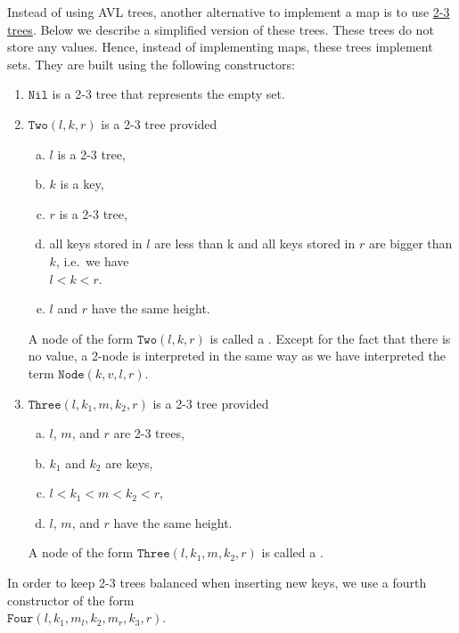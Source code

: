 \exercise
Instead of using AVL trees, another alternative to implement a map is to use 
\href{https://en.wikipedia.org/wiki/2-3_tree}{2-3 trees}.  
Below we describe a simplified version of these trees.  These trees do not store any values.  Hence, instead
of implementing maps, these trees implement sets. They are built using the following constructors:
\begin{enumerate}
\item $\texttt{Nil}$ is a 2-3 tree that represents the empty set.
\item $\texttt{Two}(l, k, r)$ is a 2-3 tree provided
      \begin{enumerate}[(a)]
      \item $l$ is a 2-3 tree,
      \item $k$ is a key,
      \item $r$ is a 2-3 tree,
      \item all keys stored in $l$ are less than k and all keys stored in $r$ are bigger than $k$,
            i.e.~we have
            \\[0.2cm]
            \hspace*{1.3cm}
            $l < k < r$.
      \item $l$ and $r$ have the same height.
      \end{enumerate}
      A node of the form  $\texttt{Two}(l, k, r)$ is called a .  Except for the fact
      that there is no value, a 2-node is
      interpreted in the same way as we have interpreted the term $\texttt{Node}(k, v, l, r)$.
\item $\texttt{Three}(l, k_1, m, k_2, r)$ is a 2-3 tree provided
      \begin{enumerate}[(a)]
      \item $l$, $m$, and $r$ are 2-3 trees,
      \item $k_1$ and $k_2$ are keys,
      \item $l < k_1 < m < k_2 < r$,
      \item $l$, $m$, and $r$ have the same height.
      \end{enumerate}
      A node of the form  $\texttt{Three}(l, k_1, m, k_2, r)$ is called a .
\end{enumerate}
In order to keep 2-3 trees balanced when inserting new keys, we use a fourth constructor of the form
\\[0.2cm]
\hspace*{1.3cm}
$\texttt{Four}(l,k_1,m_l, k_2, m_r, k_3, r)$.
\\[0.2cm]

